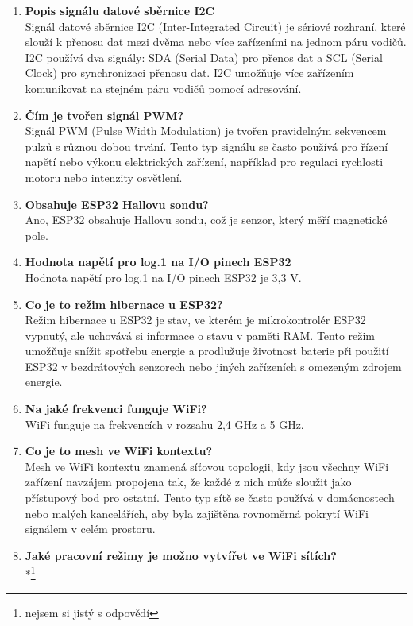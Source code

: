 \documentclass{article}
\begin{document}
\begin{enumerate}
        \item \textbf{Popis signálu datové sběrnice I2C} \\[0.6em] { Signál datové sběrnice I2C (Inter-Integrated Circuit) je sériové rozhraní, které slouží k přenosu dat mezi dvěma nebo více zařízeními na jednom páru vodičů. I2C používá dva signály: SDA (Serial Data) pro přenos dat a SCL (Serial Clock) pro synchronizaci přenosu dat. I2C umožňuje více zařízením komunikovat na stejném páru vodičů pomocí adresování.}
        \item \textbf{Čím je tvořen signál PWM?} \\[0.6em] { Signál PWM (Pulse Width Modulation) je tvořen pravidelným sekvencem pulzů s různou dobou trvání. Tento typ signálu se často používá pro řízení napětí nebo výkonu elektrických zařízení, například pro regulaci rychlosti motoru nebo intenzity osvětlení.}
        \item \textbf{Obsahuje ESP32 Hallovu sondu?} \\[0.6em] { Ano, ESP32 obsahuje Hallovu sondu, což je senzor, který měří magnetické pole.}
        \item \textbf{Hodnota napětí pro log.1 na I/O pinech ESP32} \\[0.6em] { Hodnota napětí pro log.1 na I/O pinech ESP32 je 3,3 V.}
        \item \textbf{Co je to režim hibernace u ESP32?} \\[0.6em] { Režim hibernace u ESP32 je stav, ve kterém je mikrokontrolér ESP32 vypnutý, ale uchovává si informace o stavu v paměti RAM. Tento režim umožňuje snížit spotřebu energie a prodlužuje životnost baterie při použití ESP32 v bezdrátových senzorech nebo jiných zařízeních s omezeným zdrojem energie.}
        \item \textbf{Na jaké frekvenci funguje WiFi?} \\[0.6em] { WiFi funguje na frekvencích v rozsahu 2,4 GHz a 5 GHz.}
        \item \textbf{Co je to mesh ve WiFi kontextu?} \\[0.6em] { Mesh ve WiFi kontextu znamená síťovou topologii, kdy jsou všechny WiFi zařízení navzájem propojena tak, že každé z nich může sloužit jako přístupový bod pro ostatní. Tento typ sítě se často používá v domácnostech nebo malých kancelářích, aby byla zajištěna rovnoměrná pokrytí WiFi signálem v celém prostoru.}
        \item \textbf{Jaké pracovní režimy je možno vytvířet ve WiFi sítích?} \\[0.6em] {*\footnote[1]{nejsem si jistý s odpovědí}}

\end{enumerate}
\end{document}
